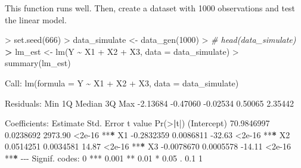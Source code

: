 \documentclass[
]{article}
\newenvironment{Shaded}{\begin{snugshade}}{\end{snugshade}}
\newcommand{\AttributeTok}[1]{\textcolor[rgb]{0.77,0.63,0.00}{#1}}
\newcommand{\CommentTok}[1]{\textcolor[rgb]{0.56,0.35,0.01}{\textit{#1}}}
\newcommand{\DecValTok}[1]{\textcolor[rgb]{0.00,0.00,0.81}{#1}}
\newcommand{\ErrorTok}[1]{\textcolor[rgb]{0.64,0.00,0.00}{\textbf{#1}}}
\newcommand{\FloatTok}[1]{\textcolor[rgb]{0.00,0.00,0.81}{#1}}
\newcommand{\FunctionTok}[1]{\textcolor[rgb]{0.00,0.00,0.00}{#1}}
\newcommand{\NormalTok}[1]{#1}
\newcommand{\OtherTok}[1]{\textcolor[rgb]{0.56,0.35,0.01}{#1}}
\newcommand{\SpecialCharTok}[1]{\textcolor[rgb]{0.00,0.00,0.00}{#1}}
\newcommand{\StringTok}[1]{\textcolor[rgb]{0.31,0.60,0.02}{#1}}
\begin{document}
This function runs well. Then, create a dataset with 1000 observations
and test the linear model.

\begin{Shaded}
\begin{Highlighting}[]
\SpecialCharTok{\textgreater{}} \FunctionTok{set.seed}\NormalTok{(}\DecValTok{666}\NormalTok{)}
\SpecialCharTok{\textgreater{}}\NormalTok{ data\_simulate }\OtherTok{\textless{}{-}} \FunctionTok{data\_gen}\NormalTok{(}\DecValTok{1000}\NormalTok{)}
\SpecialCharTok{\textgreater{}} \CommentTok{\# head(data\_simulate)}
\ErrorTok{\textgreater{}}\NormalTok{ lm\_est }\OtherTok{\textless{}{-}} \FunctionTok{lm}\NormalTok{(Y }\SpecialCharTok{\textasciitilde{}}\NormalTok{ X1 }\SpecialCharTok{+}\NormalTok{ X2 }\SpecialCharTok{+}\NormalTok{ X3, }\AttributeTok{data =}\NormalTok{ data\_simulate)}
\SpecialCharTok{\textgreater{}} \FunctionTok{summary}\NormalTok{(lm\_est)}

\NormalTok{Call}\SpecialCharTok{:}
\FunctionTok{lm}\NormalTok{(}\AttributeTok{formula =}\NormalTok{ Y }\SpecialCharTok{\textasciitilde{}}\NormalTok{ X1 }\SpecialCharTok{+}\NormalTok{ X2 }\SpecialCharTok{+}\NormalTok{ X3, }\AttributeTok{data =}\NormalTok{ data\_simulate)}

\NormalTok{Residuals}\SpecialCharTok{:}
\NormalTok{     Min       1Q   Median       3Q      Max }
\SpecialCharTok{{-}}\FloatTok{2.13684} \SpecialCharTok{{-}}\FloatTok{0.47060} \SpecialCharTok{{-}}\FloatTok{0.02534}  \FloatTok{0.50065}  \FloatTok{2.35442} 

\NormalTok{Coefficients}\SpecialCharTok{:}
\NormalTok{              Estimate Std. Error t value }\FunctionTok{Pr}\NormalTok{(}\SpecialCharTok{\textgreater{}}\ErrorTok{|}\NormalTok{t}\SpecialCharTok{|}\NormalTok{)    }
\NormalTok{(Intercept) }\FloatTok{70.9846997}  \FloatTok{0.0238692} \FloatTok{2973.90}   \SpecialCharTok{\textless{}}\FloatTok{2e{-}16} \SpecialCharTok{**}\ErrorTok{*}
\NormalTok{X1          }\SpecialCharTok{{-}}\FloatTok{0.2832359}  \FloatTok{0.0086811}  \SpecialCharTok{{-}}\FloatTok{32.63}   \SpecialCharTok{\textless{}}\FloatTok{2e{-}16} \SpecialCharTok{**}\ErrorTok{*}
\NormalTok{X2           }\FloatTok{0.0514251}  \FloatTok{0.0034581}   \FloatTok{14.87}   \SpecialCharTok{\textless{}}\FloatTok{2e{-}16} \SpecialCharTok{**}\ErrorTok{*}
\NormalTok{X3          }\SpecialCharTok{{-}}\FloatTok{0.0078670}  \FloatTok{0.0005578}  \SpecialCharTok{{-}}\FloatTok{14.11}   \SpecialCharTok{\textless{}}\FloatTok{2e{-}16} \SpecialCharTok{**}\ErrorTok{*}
\SpecialCharTok{{-}{-}{-}}
\NormalTok{Signif. codes}\SpecialCharTok{:}  \DecValTok{0} \StringTok{\textquotesingle{}***\textquotesingle{}} \FloatTok{0.001} \StringTok{\textquotesingle{}**\textquotesingle{}} \FloatTok{0.01} \StringTok{\textquotesingle{}*\textquotesingle{}} \FloatTok{0.05} \StringTok{\textquotesingle{}.\textquotesingle{}} \FloatTok{0.1} \StringTok{\textquotesingle{} \textquotesingle{}} \DecValTok{1}


\end{Highlighting}
\end{Shaded}
\end{document}
